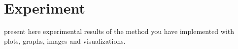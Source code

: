 \section{Experiment}
present here experimental results of the method you have implemented with plots, graphs, images and visualizations.
